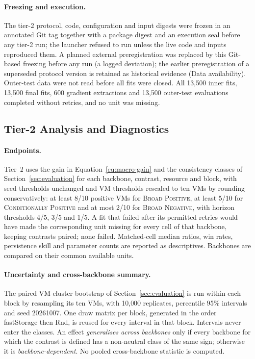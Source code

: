 \documentclass[a4paper,fleqn]{cas-dc}
\begin{document}
\paragraph{Freezing and execution.} The tier-2 protocol, code, configuration
and input digests were frozen in an annotated Git tag together with a package
digest and an execution seal before any tier-2 run; the launcher refused to
run unless the live code and inputs reproduced them. A planned external
preregistration was replaced by this Git-based freezing before any run
(a logged deviation); the earlier preregistration of a superseded protocol
version is retained as historical evidence (Data availability). Outer-test
data were not read before all fits were closed. All 13{,}500 inner fits,
13{,}500 final fits, 600 gradient extractions and 13{,}500 outer-test
evaluations completed without retries, and no unit was missing.

\subsection{Tier-2 Analysis and Diagnostics}
\label{sec:tier2-analysis}

\paragraph{Endpoints.} Tier~2 uses the gain in
Equation~\ref{eq:macro-gain} and the consistency classes of
Section~\ref{sec:evaluation} for each backbone, contrast, resource and
block, with seed thresholds unchanged and VM thresholds rescaled to ten VMs
by rounding conservatively: at least 8/10 positive VMs for
\textsc{Broad Positive}, at least 5/10 for \textsc{Conditionally Positive}
and at most 2/10 for \textsc{Broad Negative}, with horizon thresholds 4/5,
3/5 and 1/5. A fit that failed after its permitted retries would have made
the corresponding unit missing for every cell of that backbone, keeping
contrasts paired; none failed. Matched-cell median ratios, win rates,
persistence skill and parameter counts are reported as descriptives.
Backbones are compared on their common available units.

\paragraph{Uncertainty and cross-backbone summary.} The paired VM-cluster
bootstrap of Section~\ref{sec:evaluation} is run within each block by
resampling its ten VMs, with 10{,}000 replicates, percentile 95\% intervals
and seed 20261007. One draw matrix per block, generated in the order
fastStorage then Rnd, is reused for every interval in that block. Intervals
never enter the classes. An effect \emph{generalises across backbones} only
if every backbone for which the contrast is defined has a non-neutral class
of the same sign; otherwise it is \emph{backbone-dependent}. No pooled
cross-backbone statistic is computed.
\end{document}
